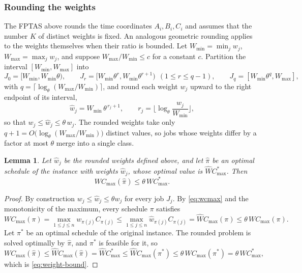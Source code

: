 ﻿\documentclass[12pt]{article}
\newtheorem{lemma}{Lemma}[section]
\begin{document}
\begin{sloppypar}
\subsubsection{Rounding the weights}
\label{subsub:fptas-weight}

The FPTAS above rounds the time coordinates $A_i,B_i,C_i$ and assumes that the number $K$ of
distinct weights is fixed. An analogous geometric rounding applies to the weights themselves when
their ratio is bounded. Let $W_{\min}=\min_{j}w_j$, $W_{\max}=\max_{j}w_j$, and suppose
$W_{\max}/W_{\min}\le c$ for a constant $c$. Partition the interval $[W_{\min},W_{\max}]$ into
\[
J_0=[W_{\min},W_{\min}\theta),\qquad
J_r=[W_{\min}\theta^{r},W_{\min}\theta^{r+1})\ \ (1\le r\le q-1),\qquad
J_q=[W_{\min}\theta^{q},W_{\max}],
\]
with $q=\big\lceil\log_\theta(W_{\max}/W_{\min})\big\rceil$, and round each weight $w_j$ upward to
the right endpoint of its interval,
\[
\hat w_j=W_{\min}\,\theta^{\,r_j+1},\qquad
r_j=\Big\lfloor\log_\theta\frac{w_j}{W_{\min}}\Big\rfloor,
\]
so that $w_j\le\hat w_j\le\theta\,w_j$. The rounded weights take only
$q+1=O\big(\log_\theta(W_{\max}/W_{\min})\big)$ distinct values, so jobs whose weights differ by a
factor at most $\theta$ merge into a single class.

\begin{lemma}\label{lem:weight-approx}
Let $\hat w_j$ be the rounded weights defined above, and let $\hat\pi$ be an optimal schedule of
the instance with weights $\hat w_j$, whose optimal value is $\hat W C_{\max}^{*}$. Then
\begin{equation}\label{eq:weight-bound}
W C_{\max}(\hat\pi)\le\theta\,W C_{\max}^{*}.
\end{equation}
\end{lemma}

\begin{proof}
By construction $w_j\le\hat w_j\le\theta w_j$ for every job $J_j$. By \cref{eq:wcmax} and the
monotonicity of the maximum,
every schedule $\pi$ satisfies
\[
W C_{\max}(\pi)=\max_{1\le j\le n}w_{\pi(j)} C_{\pi(j)}
\le\max_{1\le j\le n}\hat w_{\pi(j)} C_{\pi(j)}=\hat W C_{\max}(\pi)
\le\theta\,W C_{\max}(\pi).
\]
Let $\pi^{*}$ be an optimal schedule of the original instance. The rounded problem is solved
optimally by $\hat\pi$, and $\pi^{*}$ is feasible for it, so
\[
W C_{\max}(\hat\pi)\le\hat W C_{\max}(\hat\pi)=\hat W C_{\max}^{*}
\le\hat W C_{\max}(\pi^{*})\le\theta\,W C_{\max}(\pi^{*})=\theta\,W C_{\max}^{*},
\]
which is \cref{eq:weight-bound}.
\end{proof}


\end{sloppypar}
\end{document}
